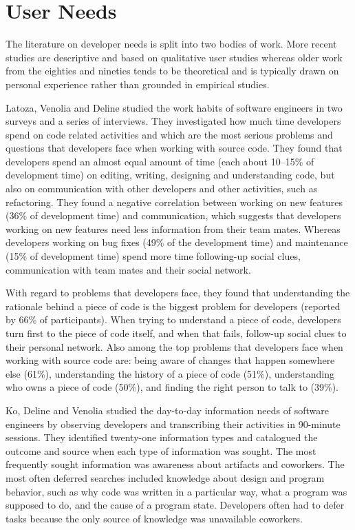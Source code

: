 \section{User Needs}

The literature on developer needs is split into two bodies of work. More recent studies are descriptive and based on qualitative user studies whereas older work from the eighties and nineties tends to be theoretical and is typically drawn on personal experience rather than grounded in empirical studies. 


Latoza, Venolia and Deline \cite{Lato06a} studied the work habits of software engineers in two surveys and a series of interviews. They investigated how much time developers spend on code related activities and which are the most serious problems and questions that developers face when working with source code. They found that developers spend an almost equal amount of time (\ie each about 10--15\% of development time) on editing, writing, designing and understanding code, but also on communication with other developers and other activities, such as refactoring. They found a negative correlation between working on new features (36\% of development time) and communication, which suggests that developers working on new features need less information from their team mates. Whereas developers working on bug fixes (49\% of the development time) and maintenance (15\% of development time) spend more time following-up social clues, \ie communication with team mates and their social network. 

With regard to problems that developers face, they found that understanding the rationale behind a piece of code is the biggest problem for developers (reported by 66\% of participants). When trying to understand a piece of code, developers turn first to the piece of code itself, and when that fails, follow-up social clues to their personal network. Also among the top problems that developers face when working with source code are: being aware of changes that happen somewhere else (61\%), understanding the history of a piece of code (51\%), understanding who owns a piece of code (50\%), and finding the right person to talk to (39\%).

Ko, Deline and Venolia \cite{Ko07a} studied the day-to-day information needs of software engineers by observing developers and transcribing their activities in 90-minute sessions. They identified twenty-one information types and catalogued the outcome and source when each type of information was sought. The most frequently sought information was awareness about artifacts and coworkers. The most often deferred searches included knowledge about design and program behavior, such as why code was written in a particular way, what a program was supposed to do, and the cause of a program state. Developers often had to defer tasks because the only source of knowledge was unavailable coworkers.  

